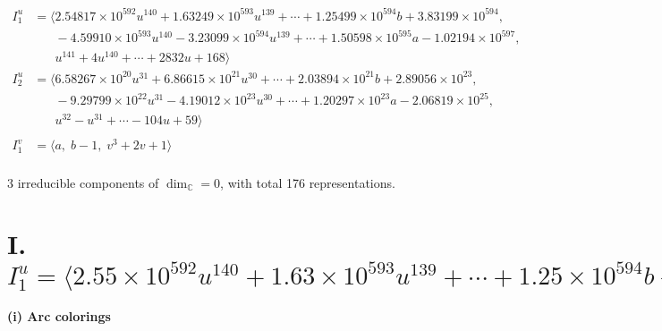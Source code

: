 \documentclass[1p]{elsarticle_modified}
\theoremstyle{definition}
\begin{document}
\begin{align*}
I^u_{1}&=\langle 
2.54817\times10^{592} u^{140}+1.63249\times10^{593} u^{139}+\cdots+1.25499\times10^{594} b+3.83199\times10^{594},\\
\phantom{I^u_{1}}&\phantom{= \langle  }-4.59910\times10^{593} u^{140}-3.23099\times10^{594} u^{139}+\cdots+1.50598\times10^{595} a-1.02194\times10^{597},\\
\phantom{I^u_{1}}&\phantom{= \langle  }u^{141}+4 u^{140}+\cdots+2832 u+168\rangle \\
I^u_{2}&=\langle 
6.58267\times10^{20} u^{31}+6.86615\times10^{21} u^{30}+\cdots+2.03894\times10^{21} b+2.89056\times10^{23},\\
\phantom{I^u_{2}}&\phantom{= \langle  }-9.29799\times10^{22} u^{31}-4.19012\times10^{23} u^{30}+\cdots+1.20297\times10^{23} a-2.06819\times10^{25},\\
\phantom{I^u_{2}}&\phantom{= \langle  }u^{32}- u^{31}+\cdots-104 u+59\rangle \\
\\
I^v_{1}&=\langle 
a,\;b-1,\;v^3+2 v+1\rangle \\
\end{align*}
\raggedright * 3 irreducible components of $\dim_{\mathbb{C}}=0$, with total 176 representations.\\
\newpage
\renewcommand{\arraystretch}{1}
\centering \section*{I. $I^u_{1}= \langle 2.55\times10^{592} u^{140}+1.63\times10^{593} u^{139}+\cdots+1.25\times10^{594} b+3.83\times10^{594},\;-4.60\times10^{593} u^{140}-3.23\times10^{594} u^{139}+\cdots+1.51\times10^{595} a-1.02\times10^{597},\;u^{141}+4 u^{140}+\cdots+2832 u+168 \rangle$}
\flushleft \textbf{(i) Arc colorings}\\
\end{document}
